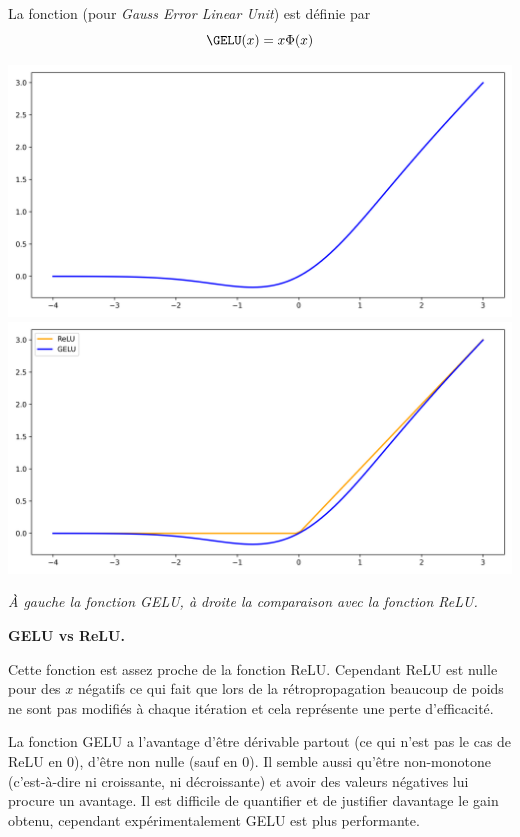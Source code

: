 \documentclass[11pt,class=report,crop=false]{standalone}
\begin{document}
La fonction  (pour \emph{Gauss Error Linear Unit}) est définie par 
$$\GELU(x) = x \Phi(x)$$


\begin{center}
	\includegraphics[scale=\myscale,scale=0.3]{figures/gelu03}\quad
	\includegraphics[scale=\myscale,scale=0.3]{figures/gelu04}
	
	\emph{À gauche la fonction GELU, à droite la comparaison avec la fonction ReLU.}	
\end{center}

\textbf{GELU vs ReLU.}

Cette fonction est assez proche de la fonction ReLU.
Cependant ReLU est nulle pour des $x$ négatifs ce qui fait que lors de la rétropropagation beaucoup de poids ne sont pas modifiés à chaque itération et cela représente une perte d'efficacité. 

La fonction GELU a l'avantage d'être dérivable partout (ce qui n'est pas le cas de ReLU en $0$), d'être non nulle (sauf en $0$). Il semble aussi qu'être non-monotone (c'est-à-dire ni croissante, ni décroissante) et avoir des valeurs négatives lui procure un avantage.
Il est difficile de quantifier et de justifier davantage le gain obtenu, cependant expérimentalement GELU est plus performante.
\end{document}
